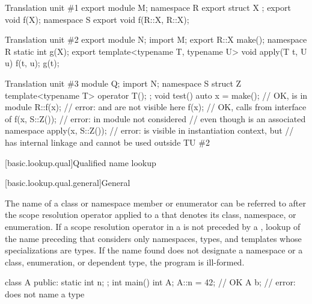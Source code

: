 \pnum
\begin{example}
\begin{codeblocktu}{Translation unit \#1}
export module M;
namespace R {
  export struct X {};
  export void f(X);
}
namespace S {
  export void f(R::X, R::X);
}
\end{codeblocktu}

\begin{codeblocktu}{Translation unit \#2}
export module N;
import M;
export R::X make();
namespace R { static int g(X); }
export template<typename T, typename U> void apply(T t, U u) {
  f(t, u);
  g(t);
}
\end{codeblocktu}

\begin{codeblocktu}{Translation unit \#3}
module Q;
import N;
namespace S {
  struct Z { template<typename T> operator T(); };
}
void test() {
  auto x = make();              // OK,  is  in module 
  R::f(x);                      // error:  and  are not visible here
  f(x);                         // OK, calls  from interface of 
  f(x, S::Z());                 // error:  in module  not considered
                                // even though  is an associated namespace
  apply(x, S::Z());             // error:  is visible in instantiation context, but
                                //  has internal linkage and cannot be used outside TU \#2
}
\end{codeblocktu}
\end{example}

[basic.lookup.qual]{Qualified name lookup}

[basic.lookup.qual.general]{General}

\pnum
{}%
%
%
The name of a class or namespace member
or enumerator can be referred to after the
\tcode{::} scope resolution operator applied to a
 that denotes its class,
namespace, or enumeration.
If a
\tcode{::} scope resolution
operator
in a  is not preceded by a ,
lookup of the name preceding that \tcode{::} considers only namespaces, types, and
templates whose specializations are types. If the
name found does not designate a namespace or a class, enumeration, or dependent type,
the program is ill-formed.
\begin{example}
\begin{codeblock}
class A {
public:
  static int n;
};
int main() {
  int A;
  A::n = 42;        // OK
  A b;              // error:  does not name a type
}
\end{codeblock}
\end{example}

